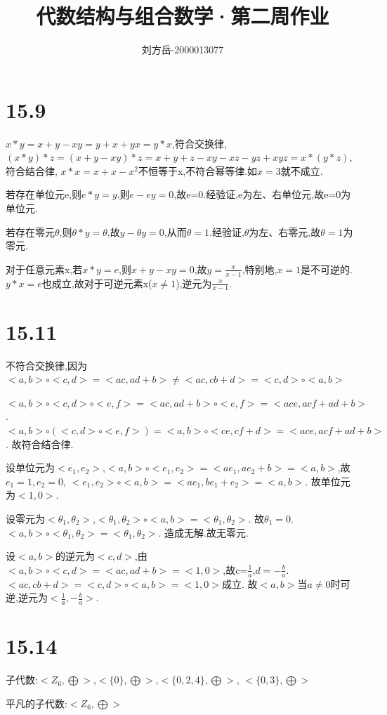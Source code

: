 \documentclass[11pt]{ctexart}
\begin{document}
\title{代数结构与组合数学·第二周作业} \author{刘方岳-2000013077} 
\maketitle

\section{15.9}
$x*y=x+y-xy=y+x+yx=y*x$,符合交换律,
$(x*y)*z=(x+y-xy)*z=x+y+z-xy-xz-yz+xyz=x*(y*z)$,符合结合律,
$x*x=x+x-x^2$不恒等于x,不符合幂等律.如$x=3$就不成立.

若存在单位元e,则$e*y=y$,则$e-ey=0$,故e=0.经验证,e为左、右单位元,故e=0为单位元.

若存在零元$\theta$,则$\theta * y=\theta$,故$y-\theta y =0$,从而$\theta=1$.经验证,$\theta$为左、右零元,故$\theta=1$为零元.

对于任意元素x,若$x*y=e$,则$x+y-xy=0$,故$y=\frac{x}{x-1}$,特别地,$x=1$是不可逆的.
$y*x=e$也成立,故对于可逆元素x($x\neq 1$),逆元为$\frac{x}{x-1}$.

\section{15.11}
不符合交换律,因为$<a,b>\circ <c,d>=<ac,ad+b>\neq <ac,cb+d> =  <c,d>\circ <a,b>$

$<a,b>\circ <c,d>\circ <e,f> = <ac,ad+b >\circ<e,f> = <ace,acf+ad+b >$.
$<a,b>\circ( <c,d>\circ <e,f>) = <a,b> \circ <ce,cf+d> =<ace,acf+ad+b>$.
故符合结合律.

设单位元为$<e_1,e_2>$,$<a,b>\circ <e_1,e_2> =<ae_1,ae_2+b> = <a,b>$,故$e_1=1,e_2=0$,
$<e_1,e_2>\circ <a,b> =<ae_1,be_1+e_2> =<a,b>$.
故单位元为$<1,0>$.

设零元为$<\theta_1,\theta_2>$,$<\theta_1,\theta_2>\circ <a,b> =<\theta_1,\theta_2>$.
故$\theta_1=0$.$<a,b> \circ <\theta_1,\theta_2>=<\theta_1,\theta_2>$.
造成无解.故无零元.

设$<a,b>$的逆元为$<c,d>$,由$<a,b>\circ <c,d>=<ac,ad+b>=<1,0>$,故c=$\frac{1}{a}$,$d=-\frac{b}{a}$.
$<ac,cb+d> =  <c,d>\circ <a,b>=<1,0>$成立.
故$<a,b>$当$a\neq 0$时可逆,逆元为$<\frac{1}{a},-\frac{b}{a}>$.

\section{15.14}
子代数:$<Z_6,\bigoplus >$,$<\{0\},\bigoplus>$,$<\{0,2,4\},\bigoplus >$,
$<\{0,3\},\bigoplus>$

平凡的子代数:$<Z_6,\bigoplus >$
\end{document}
